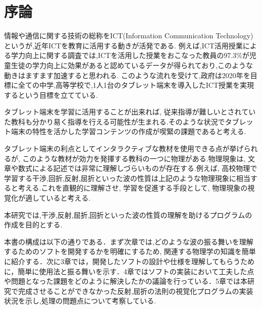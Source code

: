 \chapter{序論}
情報や通信に関する技術の総称をICT(Information Communication Technology)というが,近年ICTを教育に活用する動きが活発である.
例えば,ICT活用授業による学力向上に関する調査では,ICTを活用した授業をおこなった教員の97.3\%が児童生徒の学力向上に効果があると認めているデータが得られており,このような動きはますます加速すると思われる\cite{simizu}.
このような流れを受けて,政府は2020年を目標に全ての中学,高等学校で,1人1台のタブレット端末を導入したICT授業を実現するという目標を立てている\cite{monbu}. 

タブレット端末を学習に活用することが出来れば, 従来指導が難しいとされていた教科も分かり易く指導を行える可能性が生まれる.そのような状況でタブレット端末の特性を活かした学習コンテンツの作成が喫緊の課題であると考える.

タブレット端末の利点としてインタラクティブな教材を使用できる点が挙げられるが, このような教材が効力を発揮する教科の一つに物理がある.物理現象は, 文章や数式による記述では非常に理解しづらいものが存在する.例えば, 高校物理で学習する干渉,回折,反射,屈折といった波の性質は上記のような物理現象に相当すると考える.これを直観的に理解させ, 学習を促進する手段として, 物理現象の視覚化が適していると考える. 

本研究では,干渉,反射,屈折,回折といった波の性質の理解を助けるプログラムの作成を目的とする.

本書の構成は以下の通りである．まず次章では,どのような波の振る舞いを理解するためのソフトを開発するかを明確にするため, 関連する物理学の知識を簡単に紹介する．次に3章では，開発したソフトの設計や仕様を理解してもらうために，簡単に使用法と振る舞いを示す．4章ではソフトの実装において工夫した点や問題となった課題をどのように解決したかの議論を行っている．5章では本研究で完成させることができなかった反射,屈折の法則の視覚化プログラムの実装状況を示し,処理の問題点について考察している.